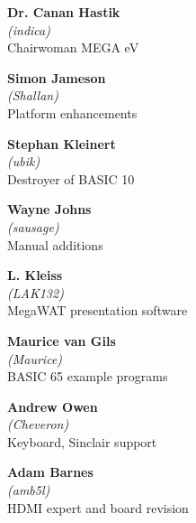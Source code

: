 \begin{mega65thanks}
\columnbreak

\begin{minipage}{\linewidth}
  {\large\bf Dr. Canan Hastik} \\
  \textit{(indica)} \\
  Chairwoman MEGA eV
\end{minipage}

\begin{minipage}{\linewidth}
  {\large\bf Simon Jameson} \\
  \textit{(Shallan)} \\
  Platform enhancements
\end{minipage}

\begin{minipage}{\linewidth}
  {\large\bf Stephan Kleinert} \\
  \textit{(ubik)} \\
  Destroyer of BASIC 10
\end{minipage}

\begin{minipage}{\linewidth}
  {\large\bf Wayne Johns} \\
  \textit{(sausage)} \\
  Manual additions
\end{minipage}

\begin{minipage}{\linewidth}
  {\large\bf L. Kleiss} \\
  \textit{(LAK132)} \\
  MegaWAT presentation software
\end{minipage}

\begin{minipage}{\linewidth}
  {\large\bf Maurice van Gils }  \\
  \textit{(Maurice)}  \\
  BASIC 65 example programs
\end{minipage}

\begin{minipage}{\linewidth}
  {\large\bf Andrew Owen}  \\
  \textit{(Cheveron)} \\
  Keyboard, Sinclair support
\end{minipage}

\begin{minipage}{\linewidth}
  {\large\bf Adam Barnes}  \\
  \textit{(amb5l)} \\
  HDMI expert and board revision
\end{minipage}

\end{mega65thanks}



